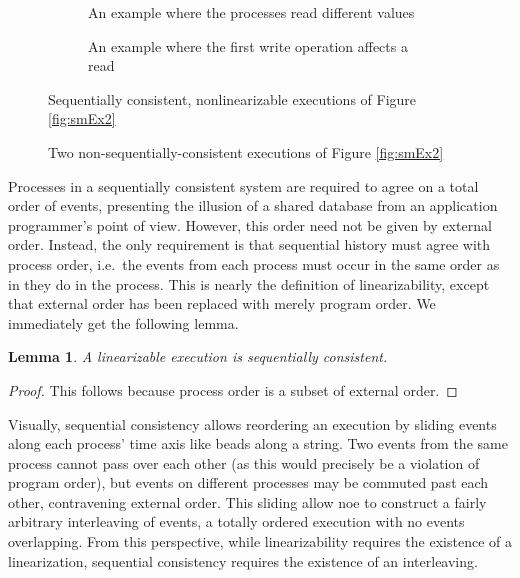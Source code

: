 \documentclass[]             %
{NASA}                       %
\newtheorem{lemma}[theorem]{Lemma}
\theoremstyle{definition}
\begin{document}
\begin{figure}[p]
  \begin{subfigure}{1\textwidth}
    \centering
    
    \caption{An example where the processes read different values}
    \label{fig:smEx1L1}
  \end{subfigure}
  \begin{subfigure}{1\textwidth}
    
    \caption{An example where the first write operation affects a read}
    \label{fig:smEx4S2}
  \end{subfigure}
  \caption{Sequentially consistent, nonlinearizable executions of Figure \ref{fig:smEx2}}
  \label{fig:smEx3}
\end{figure}
\begin{figure}[p]
  \begin{subfigure}{1\textwidth}
    \centering
    
    \caption{}
    \label{fig:smEx1L1}
  \end{subfigure}
  \begin{subfigure}{1\textwidth}
    
    \caption{}
    \label{fig:smEx4S2}
  \end{subfigure}
  \caption{Two non-sequentially-consistent executions of Figure \ref{fig:smEx2}}
  \label{fig:smEx3}
\end{figure}

Processes in a sequentially consistent system are required to agree on
a total order of events, presenting the illusion of a shared database
from an application programmer's point of view. However, this order
need not be given by external order. Instead, the only requirement is
that sequential history must agree with process order, i.e.~the events
from each process must occur in the same order as in they do in the
process.  This is nearly the definition of linearizability, except
that external order has been replaced with merely program order. We
immediately get the following lemma.

\begin{lemma}
  \label{lem:linearsequential}
  A linearizable execution is sequentially consistent.
\end{lemma}
\begin{proof}
  This follows because process order is a subset of external order.
\end{proof}

Visually, sequential consistency allows reordering an execution by
sliding events along each process' time axis like beads along a
string.  Two events from the same process cannot pass over each other
(as this would precisely be a violation of program order), but events
on different processes may be commuted past each other, contravening
external order. This sliding allow noe to construct a fairly arbitrary
interleaving of events, a totally ordered execution with no events
overlapping. From this perspective, while linearizability requires the
existence of a linearization, sequential consistency requires the
existence of an interleaving.
\end{document}
